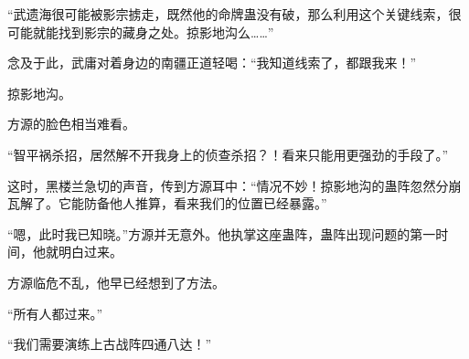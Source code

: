\begin{this_body}
“武遗海很可能被影宗掳走，既然他的命牌蛊没有破，那么利用这个关键线索，很可能就能找到影宗的藏身之处。掠影地沟么……”

念及于此，武庸对着身边的南疆正道轻喝：“我知道线索了，都跟我来！”

掠影地沟。

方源的脸色相当难看。

“智平祸杀招，居然解不开我身上的侦查杀招？！看来只能用更强劲的手段了。”

这时，黑楼兰急切的声音，传到方源耳中：“情况不妙！掠影地沟的蛊阵忽然分崩瓦解了。它能防备他人推算，看来我们的位置已经暴露。”

“嗯，此时我已知晓。”方源并无意外。他执掌这座蛊阵，蛊阵出现问题的第一时间，他就明白过来。

方源临危不乱，他早已经想到了方法。

“所有人都过来。”

“我们需要演练上古战阵四通八达！”

\end{this_body}

